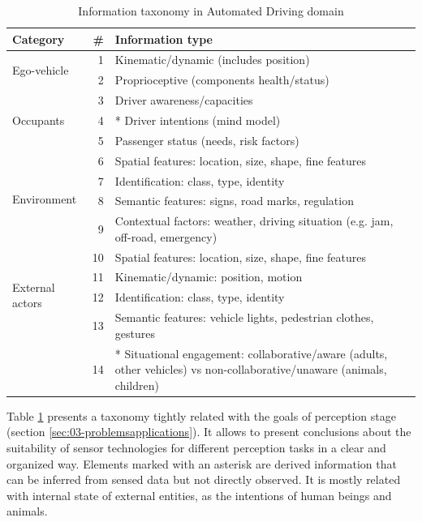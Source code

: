 \begin{table}[b] %
    \caption{Information taxonomy in Automated Driving domain}
    \label{tab:info-taxonomy}
    \begin{tabular*}{\linewidth}{lrp{5.8cm}} %
        \hline %
        \textbf{Category} & \textbf{\#}	& \textbf{Information type}	\\
        \hline %
        \multirow{2}{*}{Ego-vehicle}
        & 1 & Kinematic/dynamic (includes position) \\
        & 2 & Proprioceptive (components health/status) \\
        \hline %
        \multirow{3}{*}{Occupants}
        & 3 & Driver awareness/capacities \\
        & 4 & * Driver intentions (mind model)  \\
        & 5 & Passenger status (needs, risk factors) \\
        \hline %
        \multirow{4}{*}{Environment}
        & 6 & Spatial features: location, size, shape, fine features 
        \\
        & 7 & Identification: class, type, identity \\
        & 8 & Semantic features: signs, road marks, regulation \\
        & 9 & Contextual factors: weather, driving situation (e.g. jam, 
        off-road, emergency) \\
        \hline %
        \multirow{4}{*}{External actors}
        & 10 & Spatial features: location, size, shape, fine features  \\
        & 11 & Kinematic/dynamic: position, motion \\
        & 12 & Identification: class, type, identity \\ 
        & 13 & Semantic features: vehicle lights, pedestrian clothes, gestures 
        \\
        & 14 & * Situational engagement: collaborative/aware 
        (adults, other vehicles) vs non-collaborative/unaware 
        (animals, children) \\ 
        \hline %
    \end{tabular*}
\end{table}

Table \ref{tab:info-taxonomy} presents a taxonomy tightly related with 
the goals of perception stage (section \ref{sec:03-problemsapplications}). 
It allows to present conclusions about the suitability of sensor technologies 
for different perception tasks in a clear and organized way.
Elements marked with an asterisk are derived information that can 
be inferred from sensed data but not directly observed. It is mostly related 
with internal state of external entities, as the intentions of human beings and 
animals.

